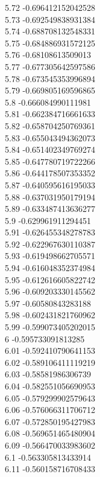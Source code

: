 {5.72	-0.696412152042528\\
5.73	-0.692549838931384\\
5.74	-0.688708132548331\\
5.75	-0.684886931572125\\
5.76	-0.68108613509013\\
5.77	-0.677305642597586\\
5.78	-0.673545353996894\\
5.79	-0.669805169596865\\
5.8	-0.666084990111981\\
5.81	-0.662384716661633\\
5.82	-0.658704250769361\\
5.83	-0.655043494362073\\
5.84	-0.651402349769274\\
5.85	-0.647780719722266\\
5.86	-0.644178507353352\\
5.87	-0.640595616195033\\
5.88	-0.637031950179194\\
5.89	-0.633487413636277\\
5.9	-0.629961911294451\\
5.91	-0.626455348278783\\
5.92	-0.622967630110387\\
5.93	-0.619498662705571\\
5.94	-0.616048352374984\\
5.95	-0.612616605822742\\
5.96	-0.609203330145562\\
5.97	-0.60580843283188\\
5.98	-0.602431821760962\\
5.99	-0.599073405202015\\
6	-0.595733091813285\\
6.01	-0.592410790641153\\
6.02	-0.589106411119219\\
6.03	-0.58581986306739\\
6.04	-0.582551056690953\\
6.05	-0.579299902579643\\
6.06	-0.576066311706712\\
6.07	-0.572850195427983\\
6.08	-0.569651465480904\\
6.09	-0.566470033983602\\
6.1	-0.563305813433914\\
6.11	-0.560158716708433\\
}
